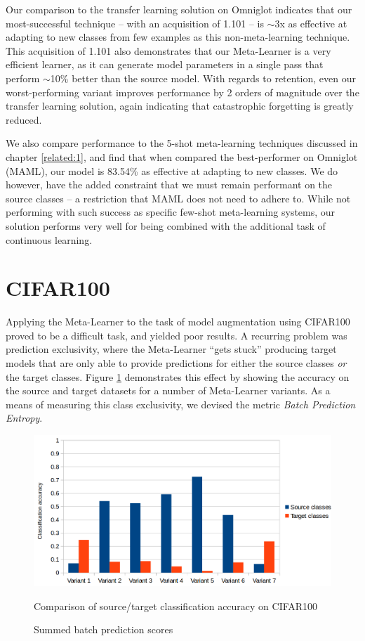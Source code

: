 \documentclass{report}
\begin{document}
Our comparison to the transfer learning solution on Omniglot indicates that our most-successful technique -- with an acquisition of 1.101 -- is $\sim$3x as effective at adapting to new classes from few examples as this non-meta-learning technique. This acquisition of 1.101 also demonstrates that our Meta-Learner is a very efficient learner, as it can generate model parameters in a single pass that perform $\sim$10\% better than the source model. With regards to retention, even our worst-performing variant improves performance by 2 orders of magnitude over the transfer learning solution, again indicating that catastrophic forgetting is greatly reduced. \par
We also compare performance to the 5-shot meta-learning techniques discussed in chapter \ref{related:1}, and find that when compared the best-performer on Omniglot (MAML\parencite{maml}), our model is 83.54\% as effective at adapting to new classes. We do however, have the added constraint that we must remain performant on the source classes -- a restriction that MAML does not need to adhere to. While not performing with such success as specific few-shot meta-learning systems, our solution performs very well for being combined with the additional task of continuous learning. \par

\section{CIFAR100}
Applying the Meta-Learner to the task of model augmentation using CIFAR100 proved to be a difficult task, and yielded poor results. A recurring problem was prediction exclusivity, where the Meta-Learner ``gets stuck'' producing target models that are only able to provide predictions for either the source classes \textit{or} the target classes. Figure \ref{fig:cifaraccuracy:1} demonstrates this effect by showing the accuracy on the source and target datasets for a number of Meta-Learner variants. As a means of measuring this class exclusivity, we devised the metric \textit{Batch Prediction Entropy}. \par
\begin{figure}[!h!]
	\centering
	\includegraphics[width=13cm]{cifaraccuracy}
	\caption{Summed batch prediction scores}
	Comparison of source/target classification accuracy on CIFAR100
	\label{fig:cifaraccuracy:1}
\end{figure}
\end{document}
